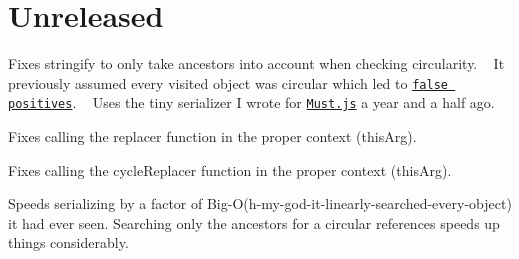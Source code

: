 \chapter{Unreleased }
\hypertarget{md_gui_2node__modules_2json-stringify-safe_2CHANGELOG}{}\label{md_gui_2node__modules_2json-stringify-safe_2CHANGELOG}
\label{md_gui_2node__modules_2json-stringify-safe_2CHANGELOG_autotoc_md971}%
%



\begin{DoxyItemize}
\item Fixes stringify to only take ancestors into account when checking circularity. ~\newline
 It previously assumed every visited object was circular which led to \href{https://github.com/isaacs/json-stringify-safe/issues/9}{\texttt{false positives}}. ~\newline
 Uses the tiny serializer I wrote for \href{https://github.com/moll/js-must}{\texttt{Must.\+js}} a year and a half ago.
\item Fixes calling the {\ttfamily replacer} function in the proper context ({\ttfamily this\+Arg}).
\item Fixes calling the {\ttfamily cycle\+Replacer} function in the proper context ({\ttfamily this\+Arg}).
\item Speeds serializing by a factor of Big-\/O(h-\/my-\/god-\/it-\/linearly-\/searched-\/every-\/object) it had ever seen. Searching only the ancestors for a circular references speeds up things considerably. 
\end{DoxyItemize}